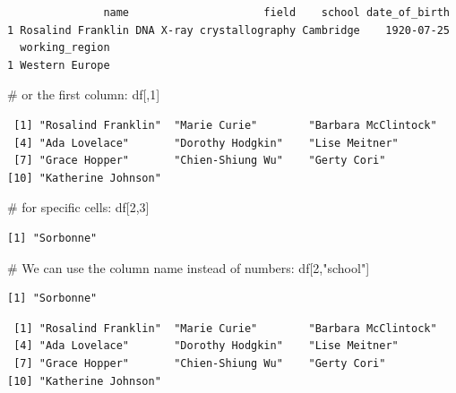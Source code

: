 \documentclass[
  letterpaper,
  DIV=11,
  numbers=noendperiod]{scrreprt}
\newenvironment{Shaded}{\begin{snugshade}}{\end{snugshade}}
\newcommand{\CommentTok}[1]{\textcolor[rgb]{0.37,0.37,0.37}{#1}}
\newcommand{\DecValTok}[1]{\textcolor[rgb]{0.68,0.00,0.00}{#1}}
\newcommand{\NormalTok}[1]{\textcolor[rgb]{0.00,0.23,0.31}{#1}}
\newcommand{\SpecialCharTok}[1]{\textcolor[rgb]{0.37,0.37,0.37}{#1}}
\newcommand{\StringTok}[1]{\textcolor[rgb]{0.13,0.47,0.30}{#1}}
\begin{document}
\begin{verbatim}
               name                     field    school date_of_birth
1 Rosalind Franklin DNA X-ray crystallography Cambridge    1920-07-25
  working_region
1 Western Europe
\end{verbatim}

\begin{Shaded}
\begin{Highlighting}[]
\CommentTok{\# or the first column: }
\NormalTok{df[,}\DecValTok{1}\NormalTok{]}
\end{Highlighting}
\end{Shaded}

\begin{verbatim}
 [1] "Rosalind Franklin"  "Marie Curie"        "Barbara McClintock"
 [4] "Ada Lovelace"       "Dorothy Hodgkin"    "Lise Meitner"      
 [7] "Grace Hopper"       "Chien-Shiung Wu"    "Gerty Cori"        
[10] "Katherine Johnson" 
\end{verbatim}

\begin{Shaded}
\begin{Highlighting}[]
\CommentTok{\# for specific cells: }
\NormalTok{df[}\DecValTok{2}\NormalTok{,}\DecValTok{3}\NormalTok{]}
\end{Highlighting}
\end{Shaded}

\begin{verbatim}
[1] "Sorbonne"
\end{verbatim}

\begin{Shaded}
\begin{Highlighting}[]
\CommentTok{\# We can use the column name instead of numbers:}
\NormalTok{df[}\DecValTok{2}\NormalTok{,}\StringTok{"school"}\NormalTok{]}
\end{Highlighting}
\end{Shaded}

\begin{verbatim}
[1] "Sorbonne"
\end{verbatim}

\begin{Shaded}
\end{Shaded}

\begin{verbatim}
 [1] "Rosalind Franklin"  "Marie Curie"        "Barbara McClintock"
 [4] "Ada Lovelace"       "Dorothy Hodgkin"    "Lise Meitner"      
 [7] "Grace Hopper"       "Chien-Shiung Wu"    "Gerty Cori"        
[10] "Katherine Johnson" 
\end{verbatim}
\end{document}
